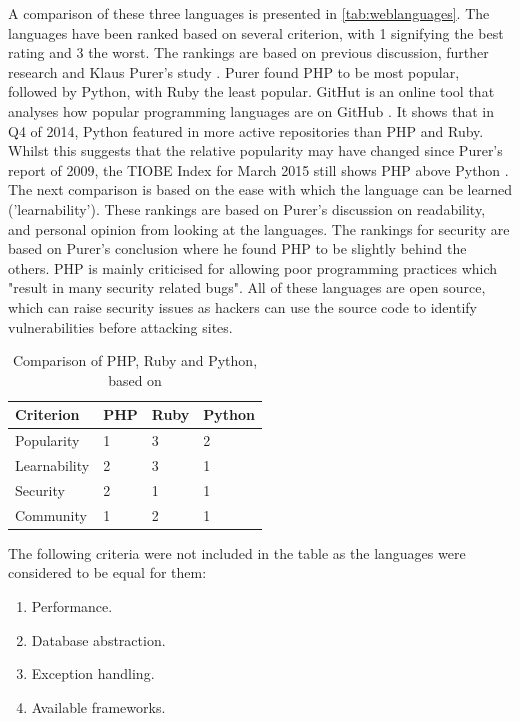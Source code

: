 \documentclass[authoryearcitations]{UoYCSproject}
\begin{document}
A comparison of these three languages is presented in \autoref{tab:weblanguages}. The languages have been ranked based on several criterion, with 1 signifying the best rating and 3 the worst. The rankings are based on previous discussion, further research and Klaus Purer's study \citep{Purer2009}. Purer found PHP to be most popular, followed by Python, with Ruby the least popular. GitHut is an online tool that analyses how popular programming languages are on GitHub \citep{Zapponi2014}. It shows that in Q4 of 2014, Python featured in more active repositories than PHP and Ruby. Whilst this suggests that the relative popularity may have changed since Purer's report of 2009, the TIOBE Index for March 2015 still shows PHP above Python \citep{TIOBESoftware2015}. The next comparison is based on the ease with which the language can be learned ('learnability'). These rankings are based on Purer's discussion on readability, and personal opinion from looking at the languages. The rankings for security are based on Purer's conclusion where he found PHP to be slightly behind the others. PHP is mainly criticised for allowing poor programming practices which "result in many security related bugs". All of these languages are open source, which can raise security issues as hackers can use the source code to identify vulnerabilities before attacking sites. 

\begin{table}[tbp]
	\center
   \caption{Comparison of PHP, Ruby and Python, based on  \citep{Purer2009}}
  \begin{tabular}{l l l l}
  	\hline
      \textbf{Criterion} & \textbf{PHP} & \textbf{Ruby} & \textbf{Python} \\ \hline
      Popularity & 1 & 3 & 2 \\ 
      Learnability & 2 & 3 & 1\\ 
	  Security & 2 & 1 & 1 \\ 
	  Community & 1 & 2 & 1 \\ \hline
  \end{tabular}
  \label{tab:weblanguages}
\end{table}

The following criteria were not included in the table as the languages were considered to be equal for them:

\begin{enumerate}
  \item Performance.
  \item Database abstraction.
  \item Exception handling.
  \item Available frameworks.
\end{enumerate}
\end{document}
